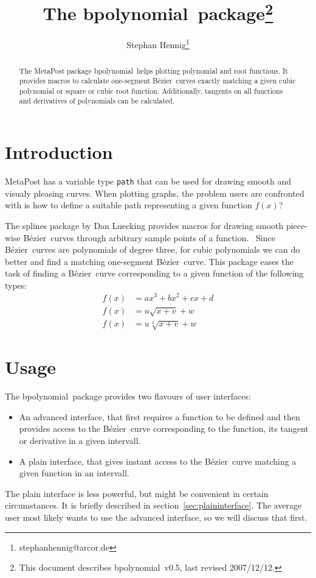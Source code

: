 \documentclass{article}
\newcommand*{\cmd}[1]{\texttt{#1}}
\newcommand*{\name}[1]{\textsf{#1}}
\newcommand*{\pkg}{\name{bpolynomial}}
\newcommand*{\B}{B\'ezier}
\begin{document}
\title{The \pkg\ package\thanks{This document describes \pkg\ v0.5, last revised 2007/12/12.}}
\author{Stephan Hennig\thanks{stephanhennig@arcor.de}}
\maketitle

\begin{abstract}
The MetaPost package \pkg\ helps plotting polynomial and root functions.  It provides macros to calculate one-segment \B\ curves exactly matching a given cubic polynomial or square or cubic root function.  Additionally, tangents on all functions and derivatives of polynomials can be calculated.
\end{abstract}

\setcounter{secnumdepth}{3}
\setcounter{tocdepth}{2}
\begin{multicols}{2}
\tableofcontents
\end{multicols}


\section{Introduction}\label{sec:intro}
MetaPost has a variable type \cmd{path} that can be used for drawing smooth and visualy pleasing curves.  When plotting graphs, the problem users are confronted with is how to define a suitable path representing a given function $f(x)$?

The \name{splines} package by Dan Luecking provides macros for drawing smooth piece-wise \B\ curves through arbitrary sample points of a function.~\cite{mp:splines}  Since \B\ curves are polynomials of degree three, for cubic polynomials we can do better and find a matching one-segment \B\ curve.  This package eases the task of finding a \B\ curve corresponding to a given function of the following types:
\begin{align}
f(x) & = ax^3 + bx^2 + cx + d \\
f(x) & = u \sqrt{x + v} + w \\
f(x) & = u \sqrt[3]{x + v} + w
\end{align}


\section{Usage}\label{sec:usage}
The \pkg\ package provides two flavours of user interfaces:
\begin{itemize}
\item  An advanced interface, that first requires a function to be defined and then provides access to the \B\ curve corresponding to the function, its tangent or derivative in a given intervall.
\item A plain interface, that gives instant access to the \B\ curve matching a given function in an intervall.
\end{itemize}
The plain interface is less powerful, but might be convenient in certain circumstances.  It is briefly described in section~\ref{sec:plaininterface}.  The average user most likely wants to use the advanced interface, so we will discuss that first.
\end{document}
